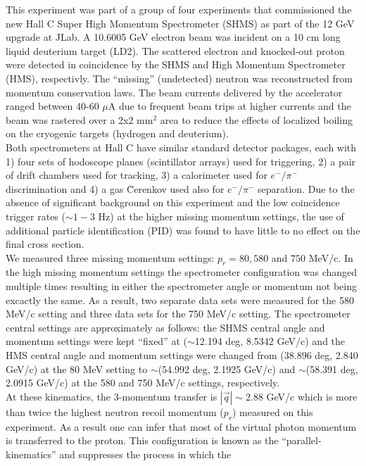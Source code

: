 \indent This experiment was part of a group of four experiments that commissioned the new Hall C Super High Momentum Spectrometer (SHMS) as part of the 12 GeV upgrade at JLab.
A 10.6005 GeV electron beam was incident on a 10 cm long liquid deuterium target (LD2). The scattered electron and knocked-out proton were detected in coincidence
by the SHMS and High Momentum Spectrometer (HMS), respectivly. The ``missing'' (undetected) neutron was reconstructed from momentum conservation laws.
The beam currents delivered by the accelerator ranged between 40-60 $\mu$A due to frequent beam trips at higher currents and the beam was rastered over a 2x2 mm$^{2}$ area to reduce
the effects of localized boiling on the cryogenic targets (hydrogen and deuterium). \\
\indent Both spectrometers at Hall C have similar standard detector packages, each with 1) four sets of hodoscope planes\cite{hodo_techreport} (scintillator arrays) used for triggering,
2) a pair of drift chambers\cite{dc_techreport} used for tracking, 3) a calorimeter\cite{Mkrtchyan_2013} used for $e^{-}/\pi^{-}$ discrimination and 4) a gas \u{C}erenkov \cite{Li_Wenliang_mthesis,ngc_techreport} used also for $e^{-}/\pi^{-}$ separation.
Due to the absence of significant background on this experiment and the low coincidence trigger rates
($\sim 1-3$ Hz) at the higher missing momentum settings, the use of additional particle identification (PID) was found to have little to no effect on the final cross section. \\
\indent We measured three missing momentum settings: $p_{r}=80,580$ and $750$ MeV/c. In the high missing momentum settings the spectrometer configuration was changed
multiple times resulting in either the spectrometer angle or momentum not being excactly the same. As a result, two separate data sets were measured for the 580 MeV/c setting and three data sets for the 750 MeV/c setting.  
The spectrometer central settings are approximately as follows: the SHMS central angle and momentum settings were kept ``fixed'' at ($\sim$12.194 deg, 8.5342 GeV/c) and the HMS central angle and momentum settings were changed from
(38.896 deg, 2.840 GeV/c) at the 80 MeV setting to $\sim$(54.992 deg, 2.1925 GeV/c) and $\sim$(58.391 deg, 2.0915 GeV/c) at the 580 and 750 MeV/c settings, respectively. \\
\indent At these kinematics, the 3-momentum transfer is $|\vec{q}| \sim 2.88$ GeV/c which is more than twice the highest neutron recoil momentum ($p_{r}$) measured on this experiment. As a result
one can infer that most of the virtual photon momentum is transferred to the proton. This configuration is known as the ``parallel-kinematics'' and suppresses the process in which the
